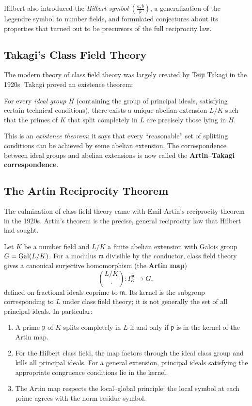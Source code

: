 Hilbert also introduced the \emph{Hilbert symbol} $\left(\frac{a,b}{\mathfrak{p}}\right)$, a generalization of the Legendre symbol to number fields, and formulated conjectures about its properties that turned out to be precursors of the full reciprocity law.

\subsection{Takagi's Class Field Theory}

The modern theory of class field theory was largely created by Teiji Takagi in the 1920s. Takagi proved an existence theorem:

\begin{theorem}[Takagi, 1920]\label{thm:takagi}
For every \emph{ideal group} $H$ (containing the group of principal ideals, satisfying certain technical conditions), there exists a unique abelian extension $L/K$ such that the primes of $K$ that split completely in $L$ are precisely those lying in $H$.
\end{theorem}

This is an \emph{existence theorem}: it says that every ``reasonable'' set of splitting conditions can be achieved by some abelian extension. The correspondence between ideal groups and abelian extensions is now called the \textbf{Artin--Takagi correspondence}.

\subsection{The Artin Reciprocity Theorem}

The culmination of class field theory came with Emil Artin's reciprocity theorem in the 1920s. Artin's theorem is the precise, general reciprocity law that Hilbert had sought.

\begin{theorem}\label{thm:artin-reciprocity}
Let $K$ be a number field and $L/K$ a finite abelian extension with Galois group $G = \operatorname{Gal}(L/K)$. For a modulus $\mathfrak m$ divisible by the conductor, class field theory gives a canonical surjective homomorphism (the \textbf{Artin map})
\[
    \left(\frac{L/K}{\cdot}\right) : I_K^{\mathfrak m} \to G,
\]
defined on fractional ideals coprime to $\mathfrak m$. Its kernel is the subgroup corresponding to $L$ under class field theory; it is not generally the set of all principal ideals. In particular:
\begin{enumerate}
    \item A prime $\mathfrak{p}$ of $K$ splits completely in $L$ if and only if $\mathfrak{p}$ is in the kernel of the Artin map.
    \item For the Hilbert class field, the map factors through the ideal class group and kills all principal ideals. For a general extension, principal ideals satisfying the appropriate congruence conditions lie in the kernel.
    \item The Artin map respects the local--global principle: the local symbol at each prime agrees with the norm residue symbol.
\end{enumerate}
\end{theorem}

